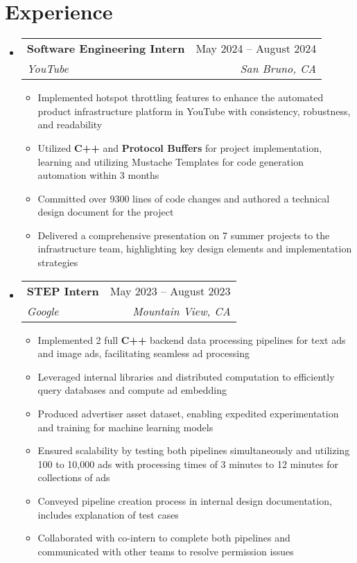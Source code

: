 \documentclass[letterpaper,11pt]{article}
\makeatletter
\newcommand{\resumeItem}[1]{
  \item\small{
    {#1 \vspace{-2pt}}
  }
}
\newcommand{\resumeSubheading}[4]{
  \vspace{-2pt}\item
    \begin{tabular*}{0.97\textwidth}[t]{l@{\extracolsep{\fill}}r}
      \textbf{#1} & #2 \\
      \textit{\small#3} & \textit{\small #4} \\
    \end{tabular*}\vspace{-7pt}
}
\newcommand{\resumeSubSubheading}[2]{
    \item
    \begin{tabular*}{0.97\textwidth}{l@{\extracolsep{\fill}}r}
      \textit{\small#1} & \textit{\small #2} \\
    \end{tabular*}\vspace{-7pt}
}
\newcommand{\resumeSubHeadingListStart}{\begin{itemize}[leftmargin=0.15in, label={}]}
\newcommand{\resumeSubHeadingListEnd}{\end{itemize}}
\newcommand{\resumeItemListStart}{\begin{itemize}}
\newcommand{\resumeItemListEnd}{\end{itemize}\vspace{-5pt}}
\makeatother
\begin{document}
\section{Experience}
  \resumeSubHeadingListStart
    \resumeSubheading
      {Software Engineering Intern}{May 2024 -- August 2024}
      {YouTube}{San Bruno, CA}
      \resumeItemListStart
        \resumeItem{Implemented hotspot throttling features to enhance the automated product infrastructure platform in YouTube with consistency, robustness, and readability}
        \resumeItem{Utilized \textbf{C++} and \textbf{Protocol Buffers} for project implementation, learning and utilizing Mustache Templates for code generation automation within 3 months}
        \resumeItem{Committed over 9300 lines of code changes and authored a technical design document for the project}
        \resumeItem{Delivered a comprehensive presentation on 7 summer projects to the infrastructure team, highlighting key design elements and implementation strategies}
      \resumeItemListEnd
    \resumeSubheading
      {STEP Intern}{May 2023 -- August 2023}
      {Google}{Mountain View, CA}
      \resumeItemListStart
        \resumeItem{Implemented 2 full \textbf{C++} backend data processing pipelines for text ads and image ads, facilitating seamless ad processing}
        \resumeItem{Leveraged internal libraries and distributed computation to efficiently query databases and compute ad embedding}
        \resumeItem{Produced advertiser asset dataset, enabling expedited experimentation and training for machine learning models}
        \resumeItem{Ensured scalability by testing both pipelines simultaneously and utilizing 100 to 10,000 ads with processing times of 3 minutes to 12 minutes for collections of ads}
        \resumeItem{Conveyed pipeline creation process in internal design documentation, includes explanation of test cases}
        \resumeItem{Collaborated with co-intern to complete both pipelines and communicated with other teams to resolve permission issues}
      \resumeItemListEnd
      
  \resumeSubHeadingListEnd


\end{document}
